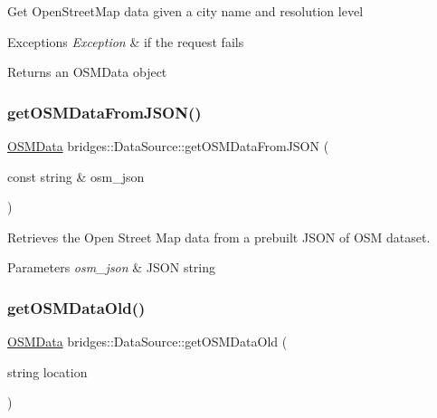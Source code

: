 Get Open\+Street\+Map data given a city name and resolution level


\begin{DoxyExceptions}{Exceptions}
{\em Exception} & if the request fails\\
\hline
\end{DoxyExceptions}
\begin{DoxyReturn}{Returns}
an O\+S\+M\+Data object 
\end{DoxyReturn}
\mbox{\label{classbridges_1_1_data_source_a1b483de1cce9921b70116213382cdaf0}} 
\subsubsection{\texorpdfstring{get\+O\+S\+M\+Data\+From\+J\+S\+O\+N()}{getOSMDataFromJSON()}}
{\footnotesize\ttfamily \hyperlink{classbridges_1_1dataset_1_1_o_s_m_data}{O\+S\+M\+Data} bridges\+::\+Data\+Source\+::get\+O\+S\+M\+Data\+From\+J\+S\+ON (\begin{DoxyParamCaption}\item[{const string \&}]{osm\+\_\+json }\end{DoxyParamCaption})\hspace{0.3cm}{\ttfamily [inline]}}

Retrieves the Open Street Map data from a prebuilt J\+S\+ON of O\+SM dataset.


\begin{DoxyParams}{Parameters}
{\em osm\+\_\+json} & J\+S\+ON string \\
\hline
\end{DoxyParams}
\mbox{\label{classbridges_1_1_data_source_a3ae5e11e0b70bed0498cf37b360820c2}} 
\subsubsection{\texorpdfstring{get\+O\+S\+M\+Data\+Old()}{getOSMDataOld()}}
{\footnotesize\ttfamily \hyperlink{classbridges_1_1dataset_1_1_o_s_m_data}{O\+S\+M\+Data} bridges\+::\+Data\+Source\+::get\+O\+S\+M\+Data\+Old (\begin{DoxyParamCaption}\item[{string}]{location }\end{DoxyParamCaption})\hspace{0.3cm}{\ttfamily [inline]}}



